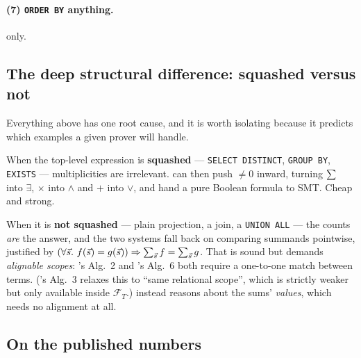 \paragraph{(7) \lstinline|ORDER BY| anything.} \sqlsolver{} only.

\subsection{The deep structural difference: squashed versus not}

Everything above has one root cause, and it is worth isolating because it predicts which
examples a given prover will handle.

When the top-level expression is \textbf{squashed} --- \lstinline|SELECT DISTINCT|,
\lstinline|GROUP BY|, \lstinline|EXISTS| --- multiplicities are irrelevant. \QED{} can then
push $\neq0$ inward, turning $\sum_{}$ into $\exists$, $\times$ into $\wedge$ and $+$ into
$\vee$, and hand a pure Boolean formula to SMT. Cheap and strong.

When it is \textbf{not squashed} --- plain projection, a join, a \lstinline|UNION ALL| ---
the counts \emph{are} the answer, and the two systems fall back on comparing summands
pointwise, justified by
$(\forall \vec s.\ f(\vec s)=g(\vec s))\Rightarrow \sum_{\vec s}f=\sum_{\vec s}g$. That is
sound but demands \emph{alignable scopes}: \udp{}'s Alg.~2 and \QED{}'s Alg.~6 both require a
one-to-one match between terms. (\QED{}'s Alg.~3 relaxes this to ``same relational scope'',
which is strictly weaker but only available inside $\mathcal F_T$.)
\sqlsolver{} instead reasons about the sums' \emph{values}, which needs no alignment at all.


\subsection{On the published numbers}

